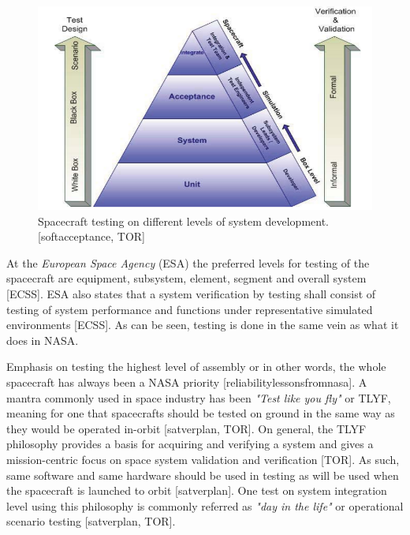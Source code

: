 \documentclass[english,12pt,a4paper,pdftex,elec,utf8]{aaltothesis}
\begin{document}
\begin{figure}[h!]
\includegraphics[scale=0.45]{spacetesting}
\caption{Spacecraft testing on different levels of system development. [softacceptance, TOR]}
\label{boxfigure}
\end{figure}
At the \textit{European Space Agency} (ESA) the preferred levels for testing of the spacecraft are equipment, subsystem, element, segment and overall system [ECSS]. ESA also states that a system verification by testing shall consist of testing of system performance and functions under representative simulated environments [ECSS]. As can be seen, testing is done in the same vein as what it does in NASA. \par 
Emphasis on testing the highest level of assembly or in other words, the whole spacecraft has always been a NASA priority [reliabilitylessonsfromnasa]. A mantra commonly used in space industry has been \textit{"Test like you fly"} or TLYF, meaning for one that spacecrafts should be tested on ground in the same way as they would be operated in-orbit [satverplan, TOR].  On general, the TLYF philosophy provides a basis for acquiring and verifying a system and gives a mission-centric focus on space system validation and verification [TOR]. As such, same software and same hardware should be used in testing as will be used when the spacecraft is launched to orbit [satverplan]. One test on system integration level using this philosophy is commonly referred as \textit{"day in the life"} or operational scenario testing [satverplan, TOR]. \par
\end{document}
